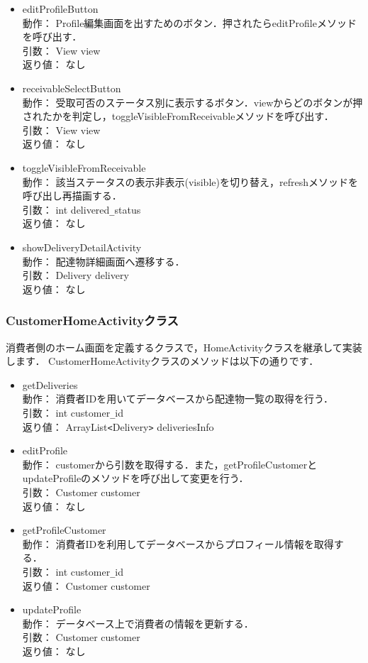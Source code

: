 \documentclass[a4j,titlepage]{jarticle}
\begin{document}
\begin{itemize}
\item editProfileButton\\
動作： Profile編集画面を出すためのボタン．押されたらeditProfileメソッドを呼び出す．\\
引数： View view\\
返り値： なし

\item receivableSelectButton\\
動作： 受取可否のステータス別に表示するボタン．viewからどのボタンが押されたかを判定し，toggleVisibleFromReceivableメソッドを呼び出す．\\
引数： View view\\
返り値： なし

\item toggleVisibleFromReceivable\\
動作： 該当ステータスの表示非表示(visible)を切り替え，refreshメソッドを呼び出し再描画する．\\
引数： int delivered\verb|_|status\\
返り値： なし

\item showDeliveryDetailActivity\\
動作： 配達物詳細画面へ遷移する．\\
引数： Delivery delivery\\
返り値： なし
\end{itemize}


\subsubsection{CustomerHomeActivityクラス}
消費者側のホーム画面を定義するクラスで，HomeActivityクラスを継承して実装します．
CustomerHomeActivityクラスのメソッドは以下の通りです．
\begin{itemize}
\item getDeliveries\\
動作： 消費者IDを用いてデータベースから配達物一覧の取得を行う．\\
引数： int customer\verb|_|id\\
返り値： ArrayList\verb|<|Delivery\verb|>| deliveriesInfo

\item editProfile\\
動作： customerから引数を取得する．また，getProfileCustomerとupdateProfileのメソッドを呼び出して変更を行う．\\
引数： Customer customer\\
返り値： なし

\item getProfileCustomer\\
動作： 消費者IDを利用してデータベースからプロフィール情報を取得する．\\
引数： int customer\verb|_|id\\
返り値： Customer customer

\item updateProfile\\
動作： データベース上で消費者の情報を更新する．\\
引数： Customer customer\\
返り値： なし
\end{itemize}
\end{document}
